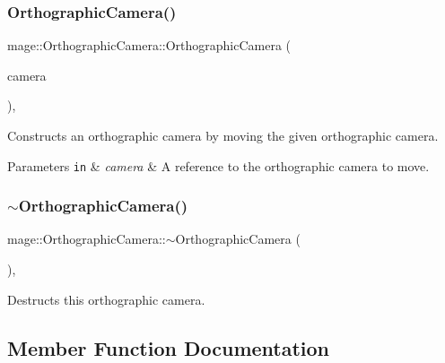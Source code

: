 \subsubsection{\texorpdfstring{Orthographic\+Camera()}{OrthographicCamera()}\hspace{0.1cm}{\footnotesize\ttfamily [3/3]}}
{\footnotesize\ttfamily mage\+::\+Orthographic\+Camera\+::\+Orthographic\+Camera (\begin{DoxyParamCaption}\item[{\hyperlink{classmage_1_1_orthographic_camera}{Orthographic\+Camera} \&\&}]{camera }\end{DoxyParamCaption})\hspace{0.3cm}{\ttfamily [default]}, {\ttfamily [noexcept]}}

Constructs an orthographic camera by moving the given orthographic camera.


\begin{DoxyParams}[1]{Parameters}
\mbox{\tt in}  & {\em camera} & A reference to the orthographic camera to move. \\
\hline
\end{DoxyParams}
\hypertarget{classmage_1_1_orthographic_camera_ac7d1f4ce12a5d0a2539b610f14f59304}{}\label{classmage_1_1_orthographic_camera_ac7d1f4ce12a5d0a2539b610f14f59304} 
\subsubsection{\texorpdfstring{$\sim$\+Orthographic\+Camera()}{~OrthographicCamera()}}
{\footnotesize\ttfamily mage\+::\+Orthographic\+Camera\+::$\sim$\+Orthographic\+Camera (\begin{DoxyParamCaption}{ }\end{DoxyParamCaption})\hspace{0.3cm}{\ttfamily [virtual]}, {\ttfamily [default]}}

Destructs this orthographic camera. 

\subsection{Member Function Documentation}
\hypertarget{classmage_1_1_orthographic_camera_a873f0a715743a7dc104935995696dd33}{}\label{classmage_1_1_orthographic_camera_a873f0a715743a7dc104935995696dd33} 

